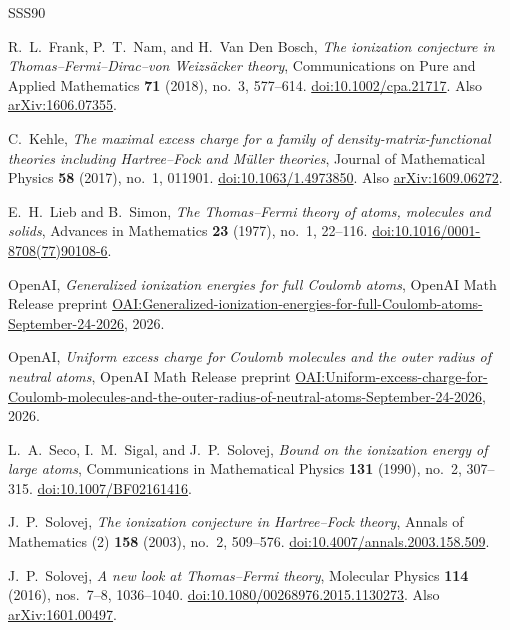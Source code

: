 \begin{thebibliography}{SSS90}

R.~L.~Frank, P.~T.~Nam, and H.~Van Den Bosch,
\emph{The ionization conjecture in Thomas--Fermi--Dirac--von Weizs\"acker theory},
Communications on Pure and Applied Mathematics \textbf{71} (2018),
no.~3, 577--614.
\href{https://doi.org/10.1002/cpa.21717}{doi:10.1002/cpa.21717}.
Also \href{https://arxiv.org/abs/1606.07355}{arXiv:1606.07355}.

C.~Kehle,
\emph{The maximal excess charge for a family of density-matrix-functional
theories including Hartree--Fock and M\"uller theories},
Journal of Mathematical Physics \textbf{58} (2017), no.~1, 011901.
\href{https://doi.org/10.1063/1.4973850}{doi:10.1063/1.4973850}.
Also \href{https://arxiv.org/abs/1609.06272}{arXiv:1609.06272}.

E.~H.~Lieb and B.~Simon,
\emph{The Thomas--Fermi theory of atoms, molecules and solids},
Advances in Mathematics \textbf{23} (1977), no.~1, 22--116.
\href{https://doi.org/10.1016/0001-8708(77)90108-6}{doi:10.1016/0001-8708(77)90108-6}.

OpenAI,
\emph{Generalized ionization energies for full Coulomb atoms},
OpenAI Math Release preprint
\href{https://github.com/openai/math/blob/main/preprints/Generalized-ionization-energies-for-full-Coulomb-atoms-September-24-2026/paper.pdf}{OAI:Generalized-ionization-energies-for-full-Coulomb-atoms-September-24-2026},
2026.

OpenAI,
\emph{Uniform excess charge for Coulomb molecules and the outer radius of neutral atoms},
OpenAI Math Release preprint
\href{https://github.com/openai/math/blob/main/preprints/Uniform-excess-charge-for-Coulomb-molecules-and-the-outer-radius-of-neutral-atoms-September-24-2026/paper.pdf}{OAI:Uniform-excess-charge-for-Coulomb-molecules-and-the-outer-radius-of-neutral-atoms-September-24-2026},
2026.

L.~A.~Seco, I.~M.~Sigal, and J.~P.~Solovej,
\emph{Bound on the ionization energy of large atoms},
Communications in Mathematical Physics \textbf{131} (1990),
no.~2, 307--315.
\href{https://doi.org/10.1007/BF02161416}{doi:10.1007/BF02161416}.

J.~P.~Solovej,
\emph{The ionization conjecture in Hartree--Fock theory},
Annals of Mathematics (2) \textbf{158} (2003), no.~2, 509--576.
\href{https://doi.org/10.4007/annals.2003.158.509}{doi:10.4007/annals.2003.158.509}.

J.~P.~Solovej,
\emph{A new look at Thomas--Fermi theory},
Molecular Physics \textbf{114} (2016), nos.~7--8, 1036--1040.
\href{https://doi.org/10.1080/00268976.2015.1130273}{doi:10.1080/00268976.2015.1130273}.
Also \href{https://arxiv.org/abs/1601.00497}{arXiv:1601.00497}.

\end{thebibliography}
